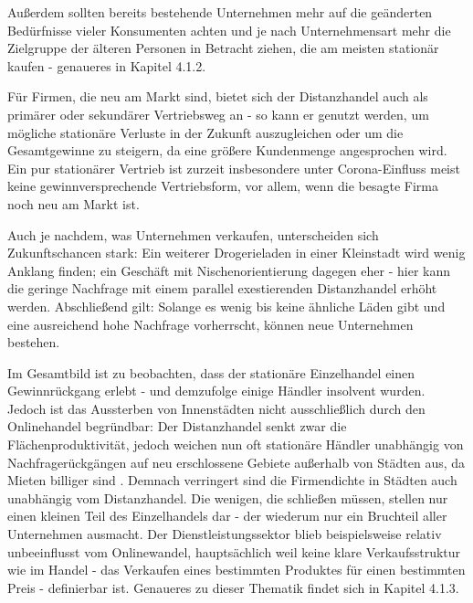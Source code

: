 \documentclass[a4paper, 12pt]{scrartcl}
\begin{document}
Außerdem sollten bereits bestehende Unternehmen mehr auf die geänderten Bedürfnisse vieler Konsumenten achten und je nach Unternehmensart mehr die Zielgruppe der älteren Personen in Betracht ziehen, die am meisten stationär kaufen - genaueres in Kapitel 4.1.2.

Für Firmen, die neu am Markt sind, bietet sich der Distanzhandel auch als primärer oder sekundärer Vertriebsweg an - so kann er genutzt werden, um mögliche stationäre Verluste in der Zukunft auszugleichen oder um die Gesamtgewinne zu steigern, da eine größere Kundenmenge angesprochen wird. Ein pur stationärer Vertrieb ist zurzeit insbesondere unter Corona-Einfluss meist keine gewinnversprechende Vertriebsform, vor allem, wenn die besagte Firma noch neu am Markt ist.

Auch je nachdem, was Unternehmen verkaufen, unterscheiden sich Zukunftschancen stark: Ein weiterer Drogerieladen in einer Kleinstadt wird wenig Anklang finden; ein Geschäft mit Nischenorientierung dagegen eher - hier kann die geringe Nachfrage mit einem parallel exestierenden Distanzhandel erhöht werden. %
Abschließend gilt: Solange es wenig bis keine ähnliche Läden gibt und eine ausreichend hohe Nachfrage vorherrscht, können neue Unternehmen bestehen.

Im Gesamtbild ist zu beobachten, dass der stationäre Einzelhandel einen Gewinnrückgang erlebt - und demzufolge einige Händler insolvent wurden. Jedoch ist das Aussterben von Innenstädten nicht ausschließlich durch den Onlinehandel begründbar: Der Distanzhandel senkt zwar die Flächenproduktivität, jedoch weichen nun oft stationäre Händler unabhängig von Nachfragerückgängen auf neu erschlossene Gebiete außerhalb von Städten aus, da Mieten billiger sind \cite[S. 30]{evilcom}. Demnach verringert sind die Firmendichte in Städten auch unabhängig vom Distanzhandel. Die wenigen, die schließen müssen, stellen nur einen kleinen Teil des Einzelhandels dar - der wiederum nur ein Bruchteil aller Unternehmen ausmacht. Der Dienstleistungssektor blieb beispielsweise relativ unbeeinflusst vom Onlinewandel, hauptsächlich weil keine klare Verkaufsstruktur wie im Handel - das Verkaufen eines bestimmten Produktes für einen bestimmten Preis - definierbar ist. Genaueres zu dieser Thematik findet sich in Kapitel 4.1.3.


    
    
    
    
\end{document}
